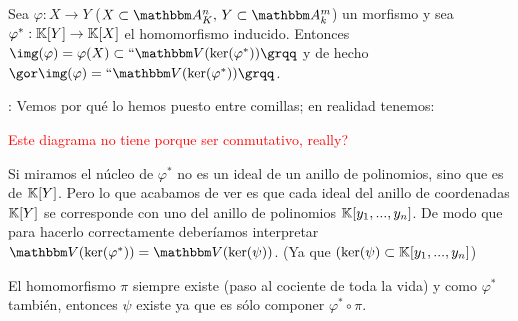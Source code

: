 \begin{lemma}[Clave]\label{lema:morf}
	Sea  $\varphi: X \rightarrow Y$ ($X  \subset \Akn,\, Y \subset \A_k^m$) un morfismo y sea $\varphi^*:\mathbb{K}[Y] \rightarrow \mathbb{K}[X]$ el homomorfismo inducido. Entonces $\img(\varphi)=\varphi(X) \subset ``\V(\ker (\varphi^*))\grqq$ y de hecho $\cls{\img(\varphi)}=``\V(\ker(\varphi^*))\grqq$.
\end{lemma}

	\notacion: Vemos por qué lo hemos puesto entre comillas; en realidad tenemos:



	\textcolor{red}{Este diagrama no tiene porque ser conmutativo, really?}




	Si miramos el núcleo de $\varphi^*$ no es un ideal de un anillo de polinomios, sino que es de $\mathbb{K}[Y]$. Pero lo que acabamos de ver es que cada ideal del anillo de coordenadas $\mathbb{K}[Y]$ se corresponde con uno del anillo de polinomios $\mathbb{K}[y_1,...,y_n]$. De modo que para hacerlo correctamente deberíamos interpretar $\V(\ker(\varphi^*))= \V(\ker(\psi))$. (Ya que $(\ker(\psi) \subset \mathbb{K}[y_1,...,y_n]$)

	El homomorfismo $\pi$ siempre existe (paso al cociente de toda la vida) y como $\varphi^*$ también, entonces $\psi$ existe ya que es sólo componer $\varphi^* \circ \pi$.


